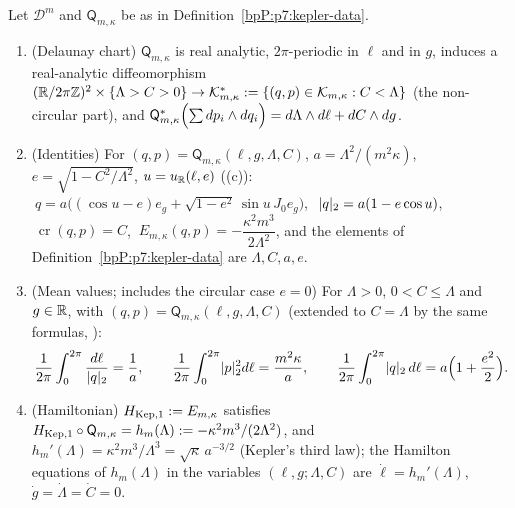 \begin{proposition}\label{bpP:p7:kepler}
Let $\mathcal D^m$ and $\mathsf Q_{m,\kappa}$ be as in Definition~\ref{bpP:p7:kepler-data}.
\begin{enumerate}[label=(\alph*)]
\item \textup{(Delaunay chart)} $\mathsf Q_{m,\kappa}$ is real analytic, $2\pi$-periodic in $\ell$ and in $g$, induces a real-analytic diffeomorphism $(\mathbb{R}/2\pi\mathbb{Z})^2\times\{\Lambda>C>0\}\to\mathcal K^*_{m,\kappa}:=\{(q,p)\in\mathcal K_{m,\kappa}:C<\Lambda\}$ (the non-circular part), and
$\mathsf Q_{m,\kappa}^*\Bigl(\sum dp_i\wedge dq_i\Bigr)=d\Lambda\wedge d\ell+dC\wedge dg$.
\item \textup{(Identities)} For $(q,p)=\mathsf Q_{m,\kappa}(\ell,g,\Lambda,C)$, $a=\Lambda^2/(m^2\kappa)$, $e=\sqrt{1-C^2/\Lambda^2}$, $u=u_{\mathbb{R}}(\ell,e)$ \textup{((c))}:
$\ q=a\bigl((\cos u-e)e_g+\sqrt{1-e^2}\,\sin u\,J_0e_g\bigr)$, $\ \lvert q\rvert_2=a(1-e\cos u)$, $\ \operatorname{cr}(q,p)=C$, $\ E_{m,\kappa}(q,p)=-\dfrac{\kappa^2m^3}{2\Lambda^2}$, and the elements of Definition~\ref{bpP:p7:kepler-data} are $\Lambda,C,a,e$.
\item \textup{(Mean values; includes the circular case $e=0$)} For $\Lambda>0$, $0<C\le\Lambda$ and $g\in\mathbb{R}$, with $(q,p)=\mathsf Q_{m,\kappa}(\ell,g,\Lambda,C)$ \textup{(extended to $C=\Lambda$ by the same formulas, )}:
\[\frac1{2\pi}\int_0^{2\pi}\frac{d\ell}{\lvert q\rvert_2}=\frac1a,\qquad\frac1{2\pi}\int_0^{2\pi}\lvert p\rvert_2^2d\ell=\frac{m^2\kappa}a,\qquad\frac1{2\pi}\int_0^{2\pi}\lvert q\rvert_2\,d\ell=a\Bigl(1+\frac{e^2}2\Bigr).\]
\item \textup{(Hamiltonian)} $H_{\rm Kep,1}:=E_{m,\kappa}$ satisfies $H_{\rm Kep,1}\circ\mathsf Q_{m,\kappa}=h_m(\Lambda):=-\kappa^2m^3/(2\Lambda^2)$, and $h_m'(\Lambda)=\kappa^2m^3/\Lambda^3=\sqrt\kappa\,a^{-3/2}$ \textup{(Kepler's third law)}; the Hamilton equations of $h_m(\Lambda)$ in the variables $(\ell,g;\Lambda,C)$ are $\dot\ell=h_m'(\Lambda)$, $\dot g=\dot\Lambda=\dot C=0$.
\end{enumerate}
\end{proposition}
